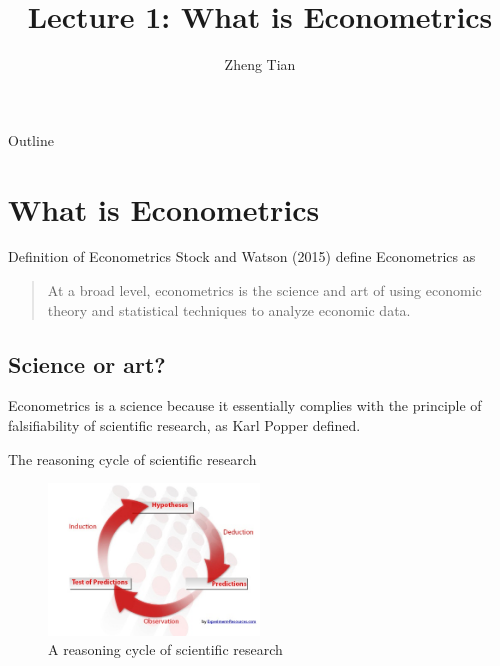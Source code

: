 \documentclass[presentation]{beamer}
\author{Zheng Tian}
\date{}
\title{Lecture 1: What is Econometrics}
\begin{document}
\maketitle
\begin{frame}{Outline}
\setcounter{tocdepth}{1}
\tableofcontents
\end{frame}


\section{What is Econometrics}
\label{sec:org7a68694}

\begin{frame}[label={sec:orgd8c6d09}]{Definition of Econometrics}
Stock and Watson (2015) define Econometrics as

\begin{quote}
At a broad level, econometrics is the science and art of using
economic theory and statistical techniques to analyze economic
data.
\end{quote}
\end{frame}


\subsection*{Science or art?}
\label{sec:org096d7b2}

Econometrics is a science because it essentially complies with the
principle of \alert{falsifiability} of scientific research, as Karl Popper
defined.

\begin{frame}[label={sec:org9c9398a}]{The reasoning cycle of scientific research}
\begin{figure}[htbp]
\centering
\includegraphics[width=0.5\textwidth]{figure/reasoning-cycle-research.jpg}
\caption{A reasoning cycle of scientific research}
\end{figure}
\end{frame}
\end{document}
